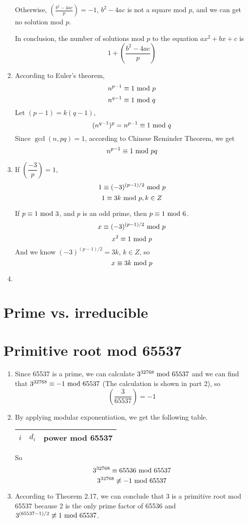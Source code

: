 \documentclass{article}
\renewcommand{\mod}{{\rm\ mod\ }}
\begin{document}
\begin{enumerate}
Otherwise, $\left(\frac{b^2-4ac}{p}\right)=-1$, $b^2-4ac$ is not a square mod $p$, and we can get no solution mod $p$.

In conclusion, the number of solutions mod $p$ to the equation $ax^2+bx+c$ is 
$$1+\left(\frac{b^2-4ac}{p}\right)$$
\item
According to Euler's theorem, $$n^{p-1}\equiv1\mod p$$ $$n^{q-1}\equiv1\mod q$$
Let $(p-1)=k(q-1)$,
$$(n^{q-1})^p=n^{p-1}\equiv1\mod q$$
Since $\gcd(n,pq)=1$, according to Chinese Reminder Theorem, we get
$$n^{p-1}\equiv1\mod pq$$

\item
If $\left(\dfrac{-3}{p}\right)=1$,
$$1\equiv(-3)^{(p-1)/2}\mod p$$
$$1\equiv3k\mod p,k\in Z$$



If $p\equiv1\mod3$, and $p$ is an odd prime, then $p\equiv1\mod6$.
$$x\equiv(-3)^{(p-1)/2}\mod p$$
$$x^2\equiv 1\mod p$$
And we know $(-3)^{(p-1)/2}=3k$, $k\in Z$, so
$$x\equiv 3k\mod p$$
\item

\end{enumerate}

\section{Prime vs. irreducible}

\section{Primitive root mod 65537}
\begin{enumerate}
\item
Since 65537 is a prime, we can calculate $3^{32768}\mod65537$ and we can find that $3^{32768}\equiv-1\mod65537$ (The calculation is shown in part 2), so $$\left(\frac{3}{65537}\right)=-1$$
\item
By applying modular exponentiation, we get the following table.
\begin{center}
\begin{tabular}{ccc}
$i$ & $d_i$ & power mod 65537 \\\hline

\end{tabular}
\end{center}

So $$3^{32768}\equiv65536\mod65537$$
$$3^{32768}\not\equiv-1\mod65537$$

\item
According to Theorem 2.17, we can conclude that 3 is a primitive root mod 65537 because 2 is the only prime factor of 65536 and $3^{(65537-1)/2}\not\equiv1\mod65537$.
\end{enumerate}
\end{document}
